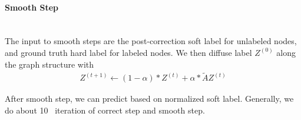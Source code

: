 \paragraph{Smooth Step} \mbox{}\\
The input to smooth steps are the post-correction soft label for unlabeled nodes, and ground truth hard label for labeled nodes. We then diffuse label $Z^{(0)}$ along the graph structure with 
    \begin{align*}
        Z^{(t+1)} \leftarrow (1-\alpha)*Z^{(t)} + \alpha * \tilde{A} Z^{(t)}
    \end{align*}

After smooth step, we can predict based on normalized soft label. Generally, we do about 10~ iteration of correct step and smooth step. 